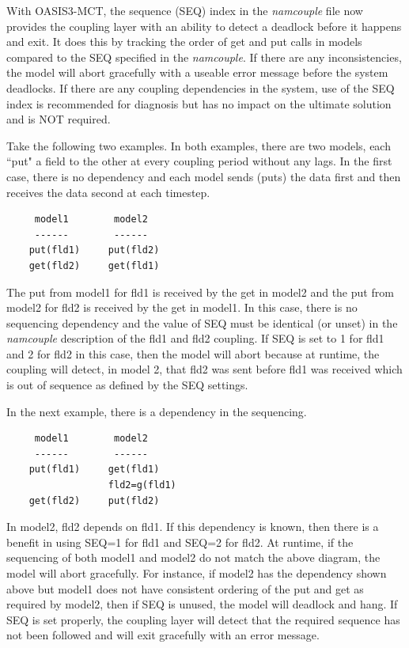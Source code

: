 With OASIS3-MCT, the sequence (SEQ) index in the {\it namcouple} file now provides the coupling 
layer with an ability to detect a deadlock before it happens and exit. 
It does this by tracking the order of get and put calls in
models compared to the SEQ specified in the {\it namcouple}.  If there are any
inconsistencies, the model will abort gracefully with a useable error
message before the system deadlocks.  If there are any coupling dependencies
in the system, use of the SEQ index is recommended for diagnosis but
has no impact on the ultimate solution and is NOT required.

Take the following two examples.  In both examples, there are two
models, each ``put" a field to the other at every coupling period
without any lags.  In the first case, there is no dependency and 
each model sends (puts) the data first and then receives the data
second at each timestep.

\begin{verbatim}
     model1        model2
     ------        ------
    put(fld1)     put(fld2)
    get(fld2)     get(fld1)
\end{verbatim}

The put from model1 for fld1 is received by the get in model2 and the
put from model2 for fld2 is received by the get in model1.  In this case,
there is no sequencing dependency and the value of SEQ must be
identical (or unset) in the {\it namcouple} description of the fld1
and fld2 coupling.  If SEQ is set to 1 for fld1 and 2 for fld2 in this case, then
the model will abort because at runtime, the coupling will detect, in model 2, that 
fld2 was sent before fld1 was received which is out of sequence
as defined by the SEQ settings.

In the next example, there is a dependency in the sequencing.

\begin{verbatim}
     model1        model2
     ------        ------
    put(fld1)     get(fld1)
                  fld2=g(fld1)
    get(fld2)     put(fld2)
\end{verbatim}

In model2, fld2 depends on fld1.  If this dependency is known, then
there is a benefit in using SEQ=1 for fld1 and SEQ=2 for fld2.  At
runtime, if the sequencing of both model1 and model2 do not match
the above diagram, the model will abort gracefully.  For instance,
if model2 has the dependency shown above but model1 does not have
consistent ordering of the put and get as required by model2,
then if SEQ is unused, the model will deadlock and hang.  If SEQ
is set properly, the coupling layer will detect that the required
sequence has not been followed and will exit gracefully with an
error message.  

